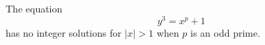 \begin{proposition}
    The equation
\[
    y^3=x^p+1
\]
    has no integer solutions for $|x|>1$ when $p$ is an odd prime.
\end{proposition}
